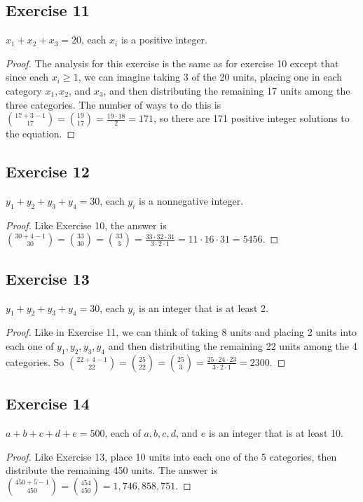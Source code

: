\documentclass[14pt]{extarticle}
\begin{document}
\subsection{Exercise 11}
\(x_1 + x_2 + x_3 = 20\), each \(x_i\) is a positive integer.

\begin{proof}
The analysis for this exercise is the same as for exercise 10 except that since each \(x_i \geq 1\), we can imagine taking 3 
of the 20 units, placing one in each category \(x_1, x_2\), and \(x_3\), and then distributing the remaining 17 units 
among the three categories. The number of ways to do this is \(\binom{17+3-1}{17} = \binom{19}{17} = \frac{19 \cdot 18}{2} = 
171\), so there are 171 positive integer solutions to the equation.
\end{proof}

\subsection{Exercise 12}
\(y_1 + y_2 + y_3 + y_4 = 30\), each \(y_i\) is a nonnegative integer.

\begin{proof}
Like Exercise 10, the answer is \(\binom{30+4-1}{30} = \binom{33}{30} = \binom{33}{3} = \frac{33 \cdot 32 \cdot 31}{3 
\cdot 2 \cdot 1} = 11 \cdot 16 \cdot 31 = 5456\).
\end{proof}

\subsection{Exercise 13}
\(y_1 + y_2 + y_3 + y_4 = 30\), each \(y_i\) is an integer that is at least 2.

\begin{proof}
Like in Exercise 11, we can think of taking 8 units and placing 2 units into each one of \(y_1,y_2,y_3,y_4\) and then
distributing the remaining 22 units among the 4 categories. So \(\binom{22+4-1}{22} = \binom{25}{22} = \binom{25}{3} = 
\frac{25 \cdot 24 \cdot 23}{3 \cdot 2 \cdot 1} = 2300\).
\end{proof}

\subsection{Exercise 14}
\(a + b + c + d + e = 500\), each of \(a, b, c, d\), and \(e\) is an integer that is at least 10.

\begin{proof}
Like Exercise 13, place 10 units into each one of the 5 categories, then distribute the remaining 450 units. The 
answer is \(\binom{450+5-1}{450} = \binom{454}{450} = 1,746,858,751\).
\end{proof}
\end{document}
